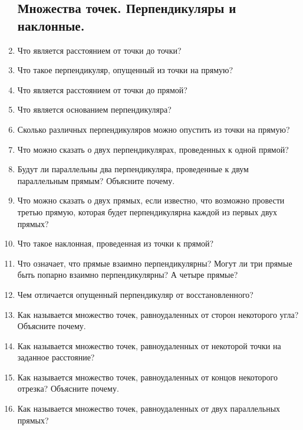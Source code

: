 \documentclass[12pt, a4paper]{article}
\begin{document}
\begin{enumerate}
	\subsection{Множества точек. Перпендикуляры и наклонные.}
	\item Что является расстоянием от точки до точки?
	\item Что такое перпендикуляр, опущенный из точки на прямую?
	\item Что является расстоянием от точки до прямой?
	\item Что является основанием перпендикуляра?
	\item Сколько различных перпендикуляров можно опустить из точки на прямую?
	\item Что можно сказать о двух перпендикулярах, проведенных к одной прямой?
	\item Будут ли параллельны два перпендикуляра, проведенные к двум параллельным прямым? Объясните почему.
	\item Что можно сказать о двух прямых, если известно, что возможно провести третью прямую, которая будет перпендикулярна каждой из первых двух прямых?
	\item Что такое наклонная, проведенная из точки к прямой?
	\item Что означает, что прямые взаимно перпендикулярны? Могут ли три прямые быть попарно взаимно перпендикулярны? А четыре прямые?
	\item Чем отличается опущенный перпендикуляр от восстановленного?
	\item Как называется множество точек, равноудаленных от сторон некоторого угла? Объясните почему.
	\item Как называется множество точек, равноудаленных от некоторой точки на заданное расстояние?
	\item Как называется множество точек, равноудаленных от концов некоторого отрезка? Объясните почему.
	\item Как называется множество точек, равноудаленных от двух параллельных прямых?

\end{enumerate}
\end{document}
